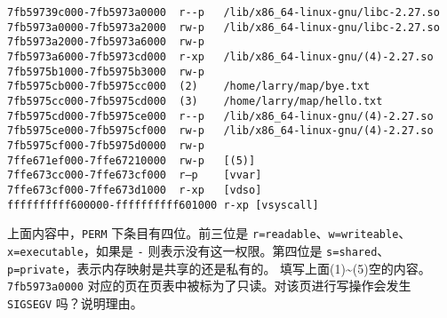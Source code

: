 \begin{problems}
\begin{verbatim}
7fb59739c000-7fb5973a0000  r--p   /lib/x86_64-linux-gnu/libc-2.27.so
7fb5973a0000-7fb5973a2000  rw-p   /lib/x86_64-linux-gnu/libc-2.27.so 
7fb5973a2000-7fb5973a6000  rw-p  
7fb5973a6000-7fb5973cd000  r-xp   /lib/x86_64-linux-gnu/(4)-2.27.so 
7fb5975b1000-7fb5975b3000  rw-p  
7fb5975cb000-7fb5975cc000  (2)    /home/larry/map/bye.txt 
7fb5975cc000-7fb5975cd000  (3)    /home/larry/map/hello.txt 
7fb5975cd000-7fb5975ce000  r--p   /lib/x86_64-linux-gnu/(4)-2.27.so
7fb5975ce000-7fb5975cf000  rw-p   /lib/x86_64-linux-gnu/(4)-2.27.so 
7fb5975cf000-7fb5975d0000  rw-p  
7ffe671ef000-7ffe67210000  rw-p   [(5)] 
7ffe673cc000-7ffe673cf000  r—p    [vvar]
7ffe673cf000-7ffe673d1000  r-xp   [vdso] 
ffffffffff600000-ffffffffff601000 r-xp [vsyscall]
        \end{verbatim}
        上面内容中，\verb|PERM| 下条目有四位。前三位是 \verb|r=readable|、\verb|w=writeable|、\verb|x=executable|，如果是 \verb|-| 则表示没有这一权限。第四位是 \verb|s=shared|、\verb|p=private|，表示内存映射是共享的还是私有的。
        \qn 填写上面(1)\textasciitilde(5)空的内容。
        \qn \verb|7fb5973a0000| 对应的页在页表中被标为了只读。对该页进行写操作会发生 \verb|SIGSEGV| 吗？说明理由。
    \end{problems}

